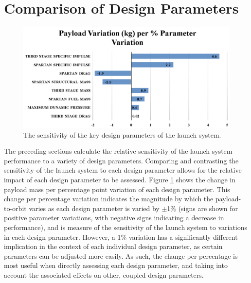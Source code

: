 \section{Comparison of Design Parameters}\label{sec:comparisonNoReturn}

\begin{figure}[ht!]
	\centering
	\includegraphics[width=0.99\linewidth]{figures/5_Ascent/BarChartRelativePayloadChange}
	\caption{The sensitivity of the key design parameters of the launch system.}
	\label{fig:BarChartRelativePayloadChange}
\end{figure}

The preceding sections calculate the relative sensitivity of the launch system performance to a variety of design parameters. 
Comparing and contrasting the sensitivity of the launch system to each design parameter allows for the relative impact of each design parameter to be assessed. 
Figure \ref{fig:BarChartRelativePayloadChange} shows the change in payload mass per percentage point variation of each design parameter. 
This change per percentage variation indicates the magnitude by which the payload-to-orbit varies as each design parameter is varied by $\pm$1\% (signs are shown for positive parameter variations, with negative signs indicating a decrease in performance), and is measure of the sensitivity of the launch system to variations in each design parameter. 
However, a 1\% variation has a significantly different implication in the context of each individual design parameter, as certain parameters can be adjusted more easily. 
As such, the change per percentage is most useful when directly assessing each design parameter, and taking into account the associated effects on other, coupled design parameters. 

